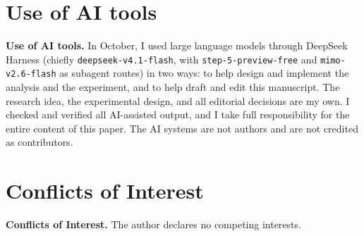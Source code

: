 \documentclass[11pt,a4paper]{article}
\begin{document}
\section*{Use of AI tools}

\textbf{Use of AI tools.} In October, I used large language models through DeepSeek Harness (chiefly \texttt{deepseek-v4.1-flash}, with \texttt{step-5-preview-free} and \texttt{mimo-v2.6-flash} as subagent routes) in two ways: to help design and implement the analysis and the experiment, and to help draft and edit this manuscript. The research idea, the experimental design, and all editorial decisions are my own. I checked and verified all AI-assisted output, and I take full responsibility for the entire content of this paper. The AI systems are not authors and are not credited as contributors.

\section*{Conflicts of Interest}

\textbf{Conflicts of Interest.} The author declares no competing interests.
\end{document}
